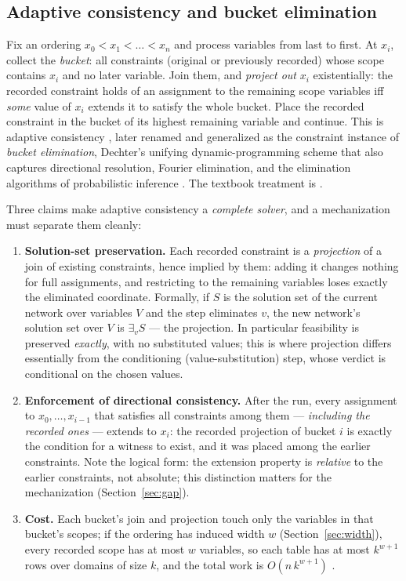 \documentclass[11pt]{article}
\begin{document}
\subsection{Adaptive consistency and bucket elimination}

Fix an ordering $x_0 < x_1 < \dots < x_n$ and process variables from
last to first. At $x_i$, collect the \emph{bucket}: all constraints
(original or previously recorded) whose scope contains $x_i$ and no
later variable. Join them, and \emph{project out} $x_i$
existentially: the recorded constraint holds of an assignment to the
remaining scope variables iff \emph{some} value of $x_i$ extends it to
satisfy the whole bucket. Place the recorded constraint in the bucket
of its highest remaining variable and continue. This is adaptive
consistency \citep{dechterpearl1987network}, later renamed and
generalized as the constraint instance of \emph{bucket elimination},
Dechter's unifying dynamic-programming scheme that also captures
directional resolution, Fourier elimination, and the elimination
algorithms of probabilistic inference \citep{dechter1999bucket}. The
textbook treatment is \citet[ch.~4]{dechter2003constraint}.

Three claims make adaptive consistency a \emph{complete solver}, and a
mechanization must separate them cleanly:

\begin{enumerate}
\item \textbf{Solution-set preservation.} Each recorded constraint is
  a \emph{projection} of a join of existing constraints, hence implied
  by them: adding it changes nothing for full assignments, and
  restricting to the remaining variables loses exactly the eliminated
  coordinate. Formally, if $S$ is the solution set of the current
  network over variables $V$ and the step eliminates $v$, the new
  network's solution set over $V$ is $\exists_v S$ --- the projection.
  In particular feasibility is preserved \emph{exactly}, with no
  substituted values; this is where projection differs essentially
  from the conditioning (value-substitution) step, whose verdict is
  conditional on the chosen values.
\item \textbf{Enforcement of directional consistency.} After the run,
  every assignment to $x_0,\dots,x_{i-1}$ that satisfies all
  constraints among them --- \emph{including the recorded ones} ---
  extends to $x_i$: the recorded projection of bucket $i$ is exactly
  the condition for a witness to exist, and it was placed among the
  earlier constraints. Note the logical form: the extension property
  is \emph{relative} to the earlier constraints, not absolute; this
  distinction matters for the mechanization
  (Section~\ref{sec:gap}).
\item \textbf{Cost.} Each bucket's join and projection touch only the
  variables in that bucket's scopes; if the ordering has induced width
  $w$ (Section~\ref{sec:width}), every recorded scope has at most $w$
  variables, so each table has at most $k^{w+1}$ rows over domains of
  size $k$, and the total work is $O(n\,k^{w+1})$
  \citep{dechterpearl1987network, dechter2003constraint}.
\end{enumerate}
\end{document}
